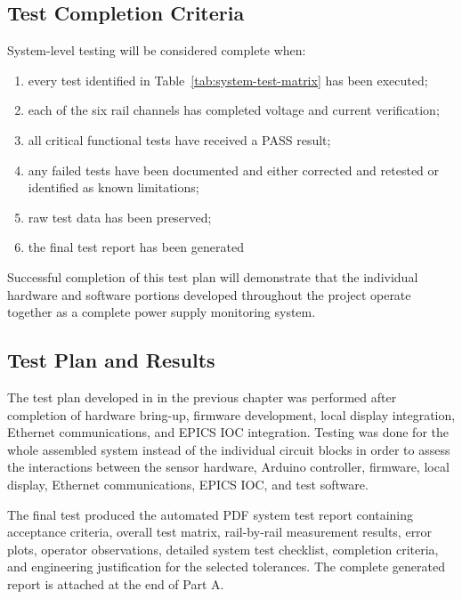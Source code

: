 \subsection{Test Completion Criteria}

System-level testing will be considered complete when:

\begin{enumerate}
    \item every test identified in Table~\ref{tab:system-test-matrix} has been executed;
    \item each of the six rail channels has completed voltage and current verification;
    \item all critical functional tests have received a PASS result;
    \item any failed tests have been documented and either corrected and retested or
    identified as known limitations;
    \item raw test data has been preserved;
    \item the final test report has been generated
\end{enumerate}

Successful completion of this test plan will demonstrate that the individual hardware
and software portions developed throughout the project operate together as a complete
power supply monitoring system.

\subsection{Test Plan and Results}
\label{sec:part-a-test-results}

The test plan developed in in the previous chapter was performed after completion of hardware bring-up, firmware development, local display integration, Ethernet communications, and EPICS IOC integration. Testing was done for the whole assembled system instead of the individual circuit blocks in order to assess the interactions between the sensor hardware, Arduino controller, firmware, local display, Ethernet communications, EPICS IOC, and test software.

The final test produced the automated PDF system test report containing acceptance criteria, overall test matrix, rail-by-rail measurement results, error plots, operator observations, detailed system test checklist, completion criteria, and engineering justification for the selected tolerances. The complete generated report is attached at the end of Part A.


